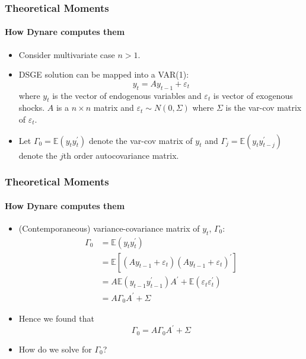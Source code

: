 \documentclass{beamer}
\newcommand{\E}{\mathbb{E}}
\begin{document}
\begin{frame}
\frametitle{Theoretical Moments}
\framesubtitle{How Dynare computes them}
\small 
\begin{itemize}
	\item Consider multivariate case $ n>1 $.
	\item DSGE solution can be mapped into a VAR(1):
	\begin{equation*}
	y_{t}=Ay_{t-1}+\varepsilon _{t}
	\end{equation*}%
	where $y_{t}$ is the vector of endogenous variables and $\varepsilon _{t}$
	is vector of exogenous shocks. $A$ is a $n\times n$ matrix and $\varepsilon
	_{t}\sim N\left( 0,\Sigma \right) $ where $\Sigma $ is the var-cov matrix of 
	$\varepsilon _{t}$. 
	\item Let $\Gamma _{0}=\E\left( y_{t}y_{t}^{\prime }\right) $ denote the var-cov
	matrix of $y_{t}$ and $\Gamma _{j}=\E\left( y_{t}y_{t-j}^{\prime }\right) $
	denote the $j$th order autocovariance matrix.
	
\end{itemize}
\end{frame}

\begin{frame}
\frametitle{Theoretical Moments}
\framesubtitle{How Dynare computes them}
\small 
\begin{itemize}
	\item (Contemporaneous) variance-covariance matrix of $ y_{t} $, $\Gamma _{0}$:
	\begin{align*}
		\Gamma _{0} &=\E\left( y_{t}y_{t}^{\prime }\right)  \\
		&=\E\left[ \left( Ay_{t-1}+\varepsilon _{t}\right) \left(
		Ay_{t-1}+\varepsilon _{t}\right) ^{\prime }\right]  \\
		&=A\E\left( y_{t-1}y_{t-1}^{\prime }\right) A^{\prime }+\E\left( \varepsilon
		_{t}\varepsilon _{t}^{\prime }\right)  \\
		&=A\Gamma _{0}A^{\prime }+\Sigma 
	\end{align*}
	\item Hence we found that 
	\begin{equation*}
	\boxed{\Gamma _{0}=A\Gamma _{0}A^{\prime }+\Sigma}
	\end{equation*}%
	\item How do we solve for $\Gamma _{0}$? 
\end{itemize}
\end{frame}
\end{document}
